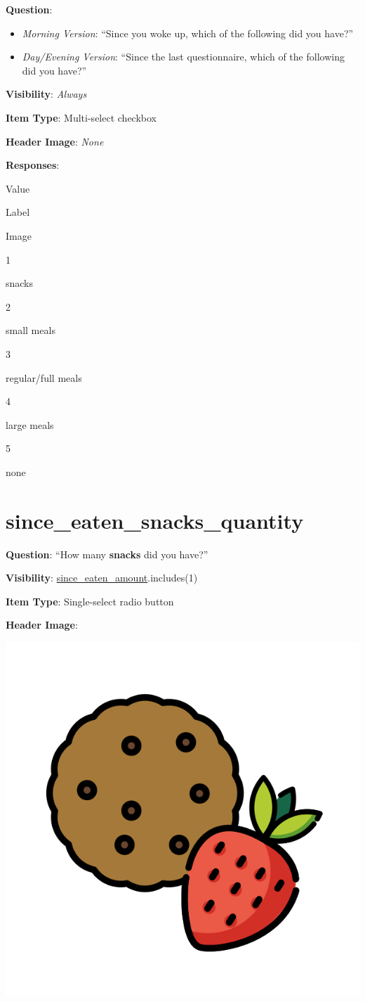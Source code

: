 \documentclass[]{book}
\providecommand{\tightlist}{%
  \setlength{\itemsep}{0pt}\setlength{\parskip}{0pt}}
\begin{document}
\textbf{Question}:

\begin{itemize}
\tightlist
\item
  \emph{Morning Version}: ``Since you woke up, which of the following did you have?''
\item
  \emph{Day/Evening Version}: ``Since the last questionnaire, which of the following did you have?''
\end{itemize}

\textbf{Visibility}: \emph{Always}

\textbf{Item Type}: Multi-select checkbox

\textbf{Header Image}: \emph{None}

\textbf{Responses}:

Value

Label

Image

1

snacks

2

small meals

3

regular/full meals

4

large meals

5

none

\hypertarget{since_eaten_snacks_quantity}{%
\section{since\_eaten\_snacks\_quantity}\label{since_eaten_snacks_quantity}}

\textbf{Question}: ``How many \textbf{snacks} did you have?''

\textbf{Visibility}: \protect\hyperlink{since_eaten_amount}{since\_eaten\_amount}.includes(1)

\textbf{Item Type}: Single-select radio button

\textbf{Header Image}:

\begin{flushleft}\includegraphics[width=0.33\linewidth]{downloadFigs4latex_NIMH_Applet_Codebook/since_eaten_snacks_quantity_headerImg} \end{flushleft}
\end{document}
